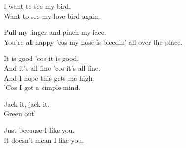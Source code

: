 


I want to see my  bird. \\
Want to see my love bird again. \\




Pull my finger and pinch my face. \\
You're all happy 'cos my nose is bleedin' all over the place. \\




It is good 'cos it is good. \\
And it's all fine 'cos it's all fine. \\
And I hope this gets me high. \\
'Cos I got a simple mind. \\




Jack it, jack it. \\
Green out! \\




Just because I like you. \\
It doesn't mean I like you. \\
